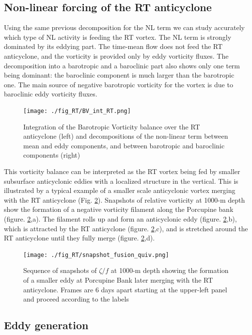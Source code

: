 \documentclass[11pt,a4paper]{article}
\begin{document}
\subsection{Non-linear forcing of the RT anticyclone}


Using the same previous decomposition for the NL term we can study accurately which type of NL activity is feeding the RT vortex. The NL term is strongly dominated by its eddying part. The time-mean flow does not feed the RT anticyclone, and the vorticity is provided only by eddy vorticity fluxes. The decomposition into a barotropic and a baroclinic part also shows only one term being dominant:  the baroclinic component is much larger than the barotropic one. The main source of negative barotropic vorticity for the vortex is due to baroclinic eddy vorticity fluxes. 

\begin{figure}[H]
\centerline{\texttt{[image: ./fig\_RT/BV\_int\_RT.png]}}
\caption{Integration of the Barotropic Vorticity balance over the RT anticyclone (left) and decompositions of the non-linear term between mean and eddy components, and between barotropic and baroclinic components (right)}
\label{vort_balance}
\end{figure} 

This vorticity balance can be interpreted as the RT vortex being fed by smaller subsurface anticyclonic eddies with a localized structure in the vertical. This is illustrated by a typical example of a smaller scale anticyclonic vortex merging with the RT anticyclone (Fig. \ref{fusion}). Snapshots of relative vorticity at 1000-m depth show the formation of a negative vorticity filament along the Porcupine bank (figure. \ref{fusion},a). The filament rolls up and form an anticyclonic eddy (figure. \ref{fusion},b), which is attracted by the RT anticyclone (figure. \ref{fusion},c), and is stretched around the RT anticyclone until they fully merge (figure. \ref{fusion},d). 

\begin{figure}[H]
\centerline{\texttt{[image: ./fig\_RT/snapshot\_fusion\_quiv.png]}}
\caption{Sequence of snapshots of $\zeta/f$ at 1000-m depth showing the formation of a smaller eddy at Porcupine Bank later merging with the RT anticyclone. Frames are 6 days apart starting at the upper-left panel and proceed according to the labels }
\label{fusion}
\end{figure} 

\subsection{Eddy generation}
\medskip
\end{document}
